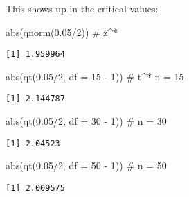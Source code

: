 \documentclass[
  letterpaper,
  DIV=11,
  numbers=noendperiod]{scrreprt}
\newenvironment{Shaded}{\begin{snugshade}}{\end{snugshade}}
\newcommand{\AttributeTok}[1]{\textcolor[rgb]{0.40,0.45,0.13}{#1}}
\newcommand{\CommentTok}[1]{\textcolor[rgb]{0.37,0.37,0.37}{#1}}
\newcommand{\DecValTok}[1]{\textcolor[rgb]{0.68,0.00,0.00}{#1}}
\newcommand{\FloatTok}[1]{\textcolor[rgb]{0.68,0.00,0.00}{#1}}
\newcommand{\FunctionTok}[1]{\textcolor[rgb]{0.28,0.35,0.67}{#1}}
\newcommand{\NormalTok}[1]{\textcolor[rgb]{0.00,0.23,0.31}{#1}}
\newcommand{\SpecialCharTok}[1]{\textcolor[rgb]{0.37,0.37,0.37}{#1}}
\begin{document}
This shows up in the critical values:

\begin{Shaded}
\begin{Highlighting}[]
\FunctionTok{abs}\NormalTok{(}\FunctionTok{qnorm}\NormalTok{(}\FloatTok{0.05}\SpecialCharTok{/}\DecValTok{2}\NormalTok{)) }\CommentTok{\# z\^{}*}
\end{Highlighting}
\end{Shaded}

\begin{verbatim}
[1] 1.959964
\end{verbatim}

\begin{Shaded}
\begin{Highlighting}[]
\FunctionTok{abs}\NormalTok{(}\FunctionTok{qt}\NormalTok{(}\FloatTok{0.05}\SpecialCharTok{/}\DecValTok{2}\NormalTok{, }\AttributeTok{df =} \DecValTok{15} \SpecialCharTok{{-}} \DecValTok{1}\NormalTok{)) }\CommentTok{\# t\^{}* n = 15}
\end{Highlighting}
\end{Shaded}

\begin{verbatim}
[1] 2.144787
\end{verbatim}

\begin{Shaded}
\begin{Highlighting}[]
\FunctionTok{abs}\NormalTok{(}\FunctionTok{qt}\NormalTok{(}\FloatTok{0.05}\SpecialCharTok{/}\DecValTok{2}\NormalTok{, }\AttributeTok{df =} \DecValTok{30} \SpecialCharTok{{-}} \DecValTok{1}\NormalTok{)) }\CommentTok{\# n = 30}
\end{Highlighting}
\end{Shaded}

\begin{verbatim}
[1] 2.04523
\end{verbatim}

\begin{Shaded}
\begin{Highlighting}[]
\FunctionTok{abs}\NormalTok{(}\FunctionTok{qt}\NormalTok{(}\FloatTok{0.05}\SpecialCharTok{/}\DecValTok{2}\NormalTok{, }\AttributeTok{df =} \DecValTok{50} \SpecialCharTok{{-}} \DecValTok{1}\NormalTok{)) }\CommentTok{\# n = 50}
\end{Highlighting}
\end{Shaded}

\begin{verbatim}
[1] 2.009575
\end{verbatim}
\end{document}
